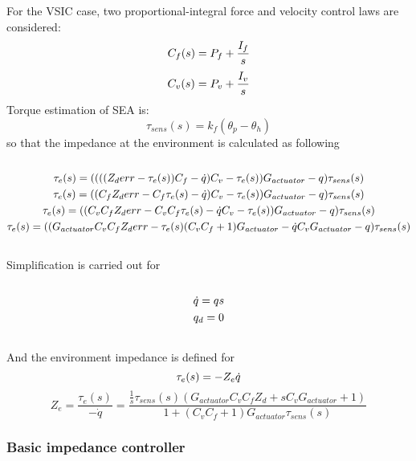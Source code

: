 \documentclass{article}
\begin{document}
For the VSIC case, two proportional-integral force and velocity control laws are considered:
\begin{equation}
C_{f}(s)=P_{f}+\frac{I_{f}}{s} \\
\end{equation}
\begin{equation}
C_{v}(s)=P_{v}+\frac{I_{v}}{s}  \\
\end{equation}
Torque estimation of SEA is:
\begin{equation}
\tau_{sens}(s)=k_f(\theta_p-\theta_h)
\end{equation}
so that the impedance at the environment is calculated as following
\begin{equation}
\begin{multlined}\\
\tau_e(s)=((((Z_{d}err-\tau_e(s))C_{f}-\dot{q})C_{v}-\tau_e(s))G_{actuator}-q)\tau_{sens}(s) \\
\tau_e(s)=((C_{f}Z_{d}err-C_{f}\tau_e(s)-\dot{q})C_{v}-\tau_e(s))G_{actuator}-q)\tau_{sens}(s) \\
\tau_e(s)=((C_{v}C_{f}Z_{d}err-C_{v}C_{f}\tau_e(s)-\dot{q}C_{v}-\tau_e(s))G_{actuator}-q)\tau_{sens}(s) \\
\tau_e(s)=((G_{actuator}C_{v}C_{f}Z_{d}err-\tau_e(s)(C_{v}C_{f}+1)G_{actuator}-\dot{q}C_{v}G_{actuator}-q)\tau_{sens}(s) \\
\end{multlined}\\
\end{equation}
Simplification is carried out for
\begin{equation}
\begin{multlined}\\
\dot{q}=qs\\
q_{d}=0 \\
\end{multlined}\\
\end{equation}
And the environment impedance is defined for
\begin{equation}
\tau_e(s)=-Z_{e}\dot{q}\\
\end{equation}
\begin{equation}
Z_{e}=\frac{\tau_e(s)}{-\dot{q}}=\frac{\frac{1}{s}\tau_{sens}(s)(G_{actuator}C_{v}C_{f}Z_{d}+sC_{v}G_{actuator}+1)}{1+(C_{v}C_{f}+1)G_{actuator}\tau_{sens}(s)}
\end{equation}
\subsubsection{Basic impedance controller}
\end{document}
